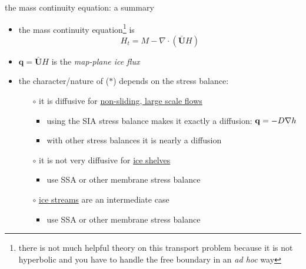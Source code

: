 \begin{frame}{the mass continuity equation: a summary}

\begin{itemize}
\item the \alert{mass continuity equation}\footnote{there is not much helpful theory on this transport problem because it is not hyperbolic and you have to handle the free boundary in an \emph{ad hoc} way} is
  \begin{equation}
  H_t = M - \nabla \cdot \left(\bar{\mathbf{U}} H\right)  \tag{$\ast$}
  \end{equation}
\item $\mathbf{q} = \bar{\mathbf{U}} H$ is the \emph{map-plane ice flux}

\medskip
\item the character/nature of ($\ast$) depends on the stress balance:
  \begin{itemize}
  \item[$\circ$] it is \alert{diffusive} for \underline{non-sliding, large scale flows}
    \begin{itemize}
    \item using the SIA stress balance makes it exactly a diffusion: $\mathbf{q} = - D \nabla h$
    \item with other stress balances it is nearly a diffusion
    \end{itemize}
  \item[$\circ$] it is \alert{not very diffusive} for \underline{ice shelves}
    \begin{itemize}
    \item use SSA or other membrane stress balance
    \end{itemize}
  \item[$\circ$] \underline{ice streams} are an intermediate case
    \begin{itemize}
    \item use SSA or other membrane stress balance
    \end{itemize}
  \end{itemize}
\end{itemize}
\end{frame}


